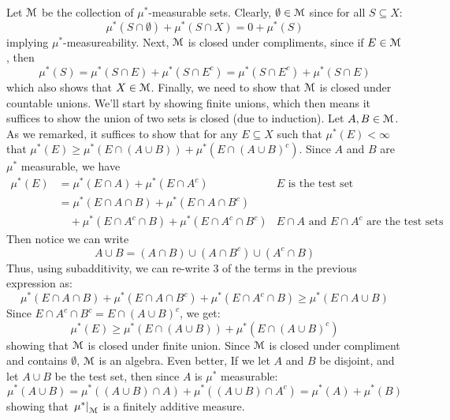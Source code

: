 \documentclass[oneside]{book}
\newcommand{\MM}{\EuScript{M}}
\newcommand{\sse}{\subseteq}
\begin{document}
\begin{Proof}
	Let $\MM$ be the collection of $\mu^*$-measurable sets. Clearly, $\emptyset \in \MM$ since for all $S \sse X$:
	\[
		 \mu^*(S\cap \emptyset) + \mu^*(S\cap X) = 0 + \mu^*(S)
	 \]
	 implying $\mu^*$-measureability. Next, $\MM$ is closed under compliments, since if $E \in \MM$, then
	 \[
		 \mu^*(S) = \mu^*(S\cap E) + \mu^*(S\cap E^c) = \mu^*(S\cap E^c) + \mu^*(S\cap E)
	 \]
	 which also shows that $X \in \MM$. Finally, we need to show that $\MM$ is closed under countable unions. We'll
	 start by showing finite unions, which then means it suffices to show the union of two sets is closed (due to
	 induction). Let $A,B \in \MM$. As we remarked, it suffices to show that for any $E \sse X$ such that  $\mu^*(E)
	 < \infty$ that $\mu^*(E) \ge \mu^*(E\cap (A\cup B)) + \mu^*(E\cap(A\cup B)^c)$. Since $A$ and $B$ are $\mu^*$ measurable, we have
	 \begin{align*}
		 \mu^*(E) &= \mu^*(E\cap A) + \mu^*(E\cap A^c) & \text{$E$ is the test set}\\
				  &= \mu^*(E\cap A\cap B) + \mu^*(E\cap A\cap B^c)\\
				  &\quad + \mu^*(E\cap A^c\cap B) + \mu^*(E\cap A^c\cap B^c) & \text{$E\cap A$ and $E\cap A^c$ are the
				  test sets}
	 \end{align*}
	 Then notice we can write
	 \[
		 A\cup B = (A\cap B) \cup (A\cap B^c) \cup (A^c\cap B)
	 \]
	 Thus, using subadditivity, we can re-write 3 of the terms in the previous expression as:
	 \[
		  \mu^*(E\cap A\cap B) + \mu^*(E\cap A\cap B^c) +\mu^*(E\cap A^c\cap B)\ge \mu^*(E\cap A\cup B)
	 \]
	 Since $E\cap A^c\cap B^c = E\cap(A\cup B)^c$, we get:
	 \[
		 \mu^*(E) \ge \mu^*(E\cap (A\cup B)) + \mu^*(E\cap(A\cup B)^c)
	 \]
	 showing that $\MM$ is closed under finite union. Since $\MM$ is closed under compliment and contains $\emptyset$,
	 $\MM$ is an algebra. Even better, If we let $A$ and $B$ be disjoint, and let $A\cup B$ be the test set, then since
	 $A$ is $\mu^*$ measurable:
	 \[
		 \mu^*(A\cup B) = \mu^*((A\cup B)\cap A) + \mu^*((A\cup B)\cap A^c) = \mu^*(A) + \mu^*(B)
	 \]
	 showing that $\left.\mu^*\right|_\MM$ is a finitely additive measure. 


\end{Proof}
\end{document}
